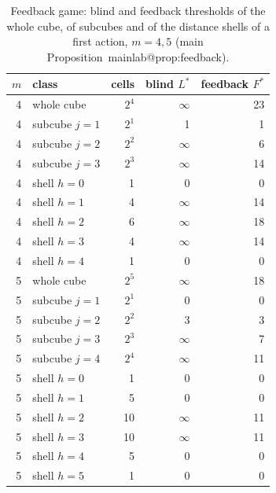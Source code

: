 \documentclass[11pt,a4paper]{article}
\makeatletter
\theoremstyle{plain}
\theoremstyle{definition}
\theoremstyle{remark}
\newcommand{\mref}[1]{\csname mainlab@#1\endcsname}
\makeatother
\begin{document}
\begin{table}[H]\centering\small
\caption{Feedback game: blind and feedback thresholds of the whole cube, of subcubes and of the distance shells of a first action, $m=4,5$ (main Proposition~\mref{prop:feedback}).}\label{tab:S5fb}
\begin{tabular}{rlrrr}
\toprule
$m$ & class & cells & blind $L^\ast$ & feedback $F^\ast$\\
\midrule
4 & whole cube & $2^4$ & $\infty$ & 23\\
4 & subcube $j=1$ & $2^1$ & 1 & 1\\
4 & subcube $j=2$ & $2^2$ & $\infty$ & 6\\
4 & subcube $j=3$ & $2^3$ & $\infty$ & 14\\
4 & shell $h=0$ & 1 & 0 & 0\\
4 & shell $h=1$ & 4 & $\infty$ & 14\\
4 & shell $h=2$ & 6 & $\infty$ & 18\\
4 & shell $h=3$ & 4 & $\infty$ & 14\\
4 & shell $h=4$ & 1 & 0 & 0\\
5 & whole cube & $2^5$ & $\infty$ & 18\\
5 & subcube $j=1$ & $2^1$ & 0 & 0\\
5 & subcube $j=2$ & $2^2$ & 3 & 3\\
5 & subcube $j=3$ & $2^3$ & $\infty$ & 7\\
5 & subcube $j=4$ & $2^4$ & $\infty$ & 11\\
5 & shell $h=0$ & 1 & 0 & 0\\
5 & shell $h=1$ & 5 & 0 & 0\\
5 & shell $h=2$ & 10 & $\infty$ & 11\\
5 & shell $h=3$ & 10 & $\infty$ & 11\\
5 & shell $h=4$ & 5 & 0 & 0\\
5 & shell $h=5$ & 1 & 0 & 0\\
\bottomrule
\end{tabular}
\end{table}
\end{document}
